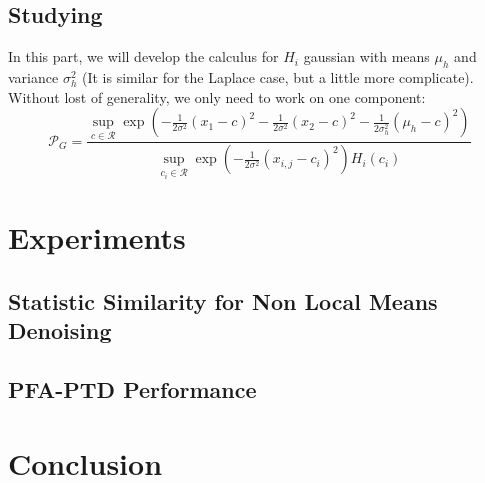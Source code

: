 \documentclass[runningheads]{llncs}
\newcommand{\wdist}[3]{\frac{1}{2#3}(#1-#2 )^2}
\begin{document}
\subsection{Studying}
In this part, we will develop the calculus for $H_i$ gaussian with means $\mu_h$ and variance $\sigma_h^2$ (It is similar for the Laplace case, but a little more complicate). Without lost of generality, we only need to work on one component:
\[
 \mathcal{P}_G = \frac{\sup_{c\in \mathcal{R}} \exp(-\wdist{x_1}{c}{\sigma^2}-\wdist{x_2}{c}{\sigma^2}-\wdist{\mu_h}{c}{\sigma_h^2}) }
{\sup_{c_i\in \mathcal{R}} \exp(-\frac{1}{2\sigma^2}(x_{i,j}-c_i )^2) H_i(c_i)  }
\]
\section{Experiments}
\subsection{Statistic Similarity for Non Local Means Denoising}
\subsection{PFA-PTD Performance}
\section{Conclusion}

\newpage



\end{document}
